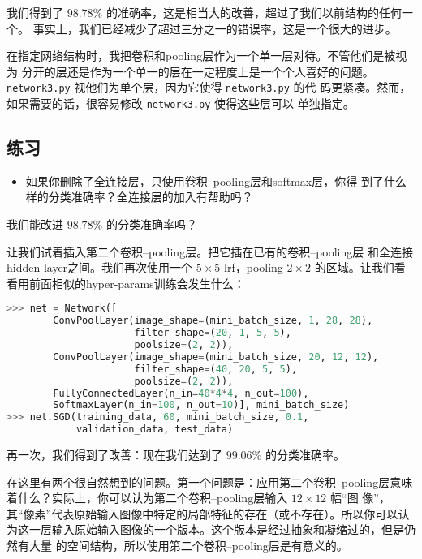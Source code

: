 我们得到了 $98.78$\% 的准确率，这是相当大的改善，超过了我们以前结构的任何一个。
事实上，我们已经减少了超过三分之一的错误率，这是一个很大的进步。

在指定网络结构时，我把卷积和\gls*{pooling}层作为一个单一层对待。不管他们是被视为
分开的层还是作为一个单一的层在一定程度上是一个个人喜好的问题。
\lstinline!network3.py! 视他们为单个层，因为它使得 \lstinline!network3.py! 的代
码更紧凑。然而，如果需要的话，很容易修改 \lstinline!network3.py! 使得这些层可以
单独指定。

\subsection*{练习}

\begin{itemize}
\item 如果你删除了全连接层，只使用卷积--\gls*{pooling}层和\gls*{softmax}层，你得
  到了什么样的分类准确率？全连接层的加入有帮助吗？
\end{itemize}

我们能改进 $98.78$\% 的分类准确率吗？

让我们试着插入第二个卷积--\gls*{pooling}层。把它插在已有的卷积--\gls*{pooling}层
和全连接\gls*{hidden-layer}之间。我们再次使用一个 $5 \times 5$ \gls*{lrf}，\gls*{pooling} $2
\times 2$ 的区域。让我们看看用前面相似的\gls*{hyper-params}训练会发生什么：
\begin{lstlisting}[language=Python]
>>> net = Network([
        ConvPoolLayer(image_shape=(mini_batch_size, 1, 28, 28), 
                      filter_shape=(20, 1, 5, 5), 
                      poolsize=(2, 2)),
        ConvPoolLayer(image_shape=(mini_batch_size, 20, 12, 12), 
                      filter_shape=(40, 20, 5, 5), 
                      poolsize=(2, 2)),
        FullyConnectedLayer(n_in=40*4*4, n_out=100),
        SoftmaxLayer(n_in=100, n_out=10)], mini_batch_size)
>>> net.SGD(training_data, 60, mini_batch_size, 0.1, 
            validation_data, test_data)        
\end{lstlisting}

再一次，我们得到了改善：现在我们达到了 $99.06$\% 的分类准确率。

在这里有两个很自然想到的问题。第一个问题是：应用第二个卷积--\gls*{pooling}层意味
着什么？实际上，你可以认为第二个卷积--\gls*{pooling}层输入 $12 \times 12$ 幅“图
像”，其“像素”代表原始输入图像中特定的局部特征的存在（或不存在）。所以你可以认
为这一层输入原始输入图像的一个版本。这个版本是经过抽象和凝缩过的，但是仍然有大量
的空间结构，所以使用第二个卷积--\gls*{pooling}层是有意义的。

